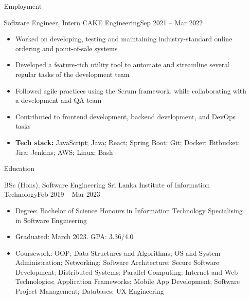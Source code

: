 \documentclass[garamond, a4paper]{modest-cv}
\begin{document}
	\makeheader

	\begin{cvsection}{Employment}
		\begin{cvsubsection}[2]{Software Engineer, Intern }{CAKE Engineering}{Sep 2021 -- Mar 2022 }			
			\begin{itemize}
				\item Worked on developing, testing and maintaining industry-standard online ordering and point-of-sale systems
				\item Developed a feature-rich utility tool to automate and streamline several regular tasks of the development team
				\item Followed agile practices using the Scrum framework, while collaborating with a development and QA team
				\item Contributed to frontend development, backend development, and DevOps tasks
				\item \textbf{Tech stack:} JavaScript; Java; React; Spring Boot; Git; Docker; Bitbucket; Jira; Jenkins; AWS; Linux; Bash
			\end{itemize}
		\end{cvsubsection}
	\end{cvsection}

	\begin{cvsection}{Education}
		\begin{cvsubsection}[2]{BSc (Hons), Software Engineering }{Sri Lanka Institute of \linebreak Information Technology}{Feb 2019 -- Mar 2023 }
			\begin{itemize}
				\item Degree: Bachelor of Science Honours in Information Technology Specialising in Software Engineering
				\item Graduated: March 2023. GPA: 3.36/4.0
				\item Coursework: OOP; Data Structures and Algorithms; OS and System Administration; Networking; Software Architecture; Secure Software Development; Distributed Systems; Parallel Computing; Internet and Web Technologies; Application Frameworks; Mobile App Development; Software Project Management; Databases; UX Engineering
			\end{itemize}
		\end{cvsubsection}
	\end{cvsection}
\end{document}

